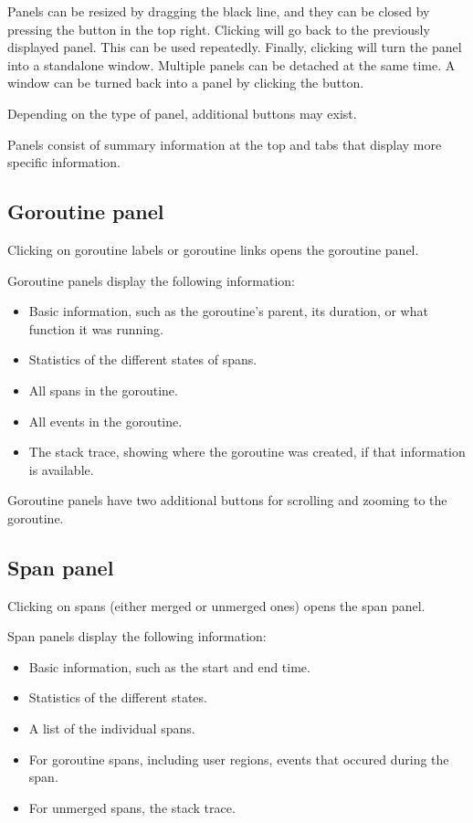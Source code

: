 \documentclass[10pt,letterpaper,oneside,openany,english]{memoir}
\begin{document}
Panels can be resized by dragging the black line, and they can be closed by pressing the  button in the top right.
Clicking  will go back to the previously displayed panel. This can be used repeatedly.
Finally, clicking  will turn the panel into a standalone window.
Multiple panels can be detached at the same time.
A window can be turned back into a panel by clicking the  button.

Depending on the type of panel, additional buttons may exist.

Panels consist of summary information at the top and tabs that display more specific information.

\subsection{Goroutine panel}

Clicking on goroutine labels or goroutine links opens the goroutine panel.

Goroutine panels display the following information:

\begin{itemize}
\item Basic information, such as the goroutine's parent, its duration, or what function it was running.
\item Statistics of the different states of spans.
\item All spans in the goroutine.
\item All events in the goroutine.
\item The stack trace, showing where the goroutine was created, if that information is available.
\end{itemize}

Goroutine panels have two additional buttons for scrolling and zooming to the goroutine.

\subsection{Span panel}\label{span-panel}

Clicking on spans (either merged or unmerged ones) opens the span panel.

Span panels display the following information:

\begin{itemize}
\item Basic information, such as the start and end time.
\item Statistics of the different states.
\item A list of the individual spans.
\item For goroutine spans, including user regions, events that occured during the span.
\item For unmerged spans, the stack trace.
\end{itemize}
\end{document}

